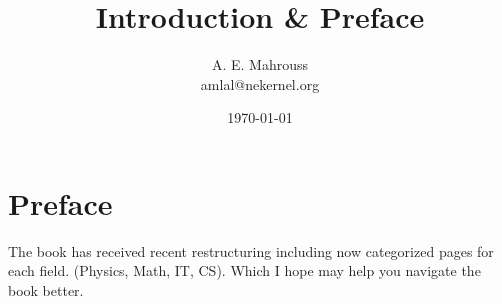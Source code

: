 \documentclass[10pt, twocolumn]{article}
\title{Introduction \& Preface}
\author{A. E. Mahrouss\\amlal@nekernel.org}
\date{\today}
\theoremstyle{plain}
\theoremstyle{definition}
\theoremstyle{remark}
\begin{document}
\twocolumn[{%
  \maketitle
  \vspace{-0.5em}
  \vspace{0.8em}
  \rule{\linewidth}{0.4pt}
  \vspace{1em}
}]


\section{Preface}

The book has received recent restructuring including now categorized pages for each field. (Physics, Math, IT, CS). Which I hope may help you navigate the book better.

\nocite{*}


\end{document}
